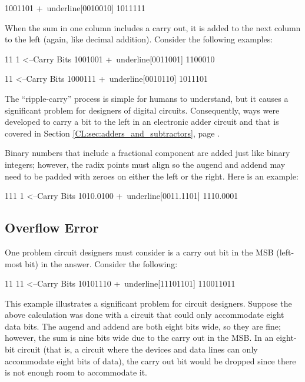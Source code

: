 \begin{binDisp}[commandchars=~\[\]]
      1001101
     +~underline[0010010]
      1011111
\end{binDisp}

When the sum in one column includes a carry out, it is added to the next column to the left (again, like decimal addition). Consider the following examples:

\begin{binDisp}[commandchars=~\[\]]
       11  1  <--Carry Bits
      1001001
     +~underline[0011001]
      1100010
\end{binDisp}

\begin{binDisp}[commandchars=~\[\], samepage=true]
         11   <--Carry Bits
      1000111
     +~underline[0010110]
      1011101
\end{binDisp}

The ``ripple-carry'' process is simple for humans to understand, but it causes a significant problem for designers of digital circuits. Consequently, ways were developed to carry a bit to the left in an electronic adder circuit and that is covered in Section \ref{CL:sec:adders_and_subtractors}, page \pageref{CL:sec:adders_and_subtractors}.

Binary numbers that include a fractional component are added just like binary integers; however, the radix points must align so the augend and addend may need to be padded with zeroes on either the left or the right. Here is an example: 

\begin{binDisp}[commandchars=~\[\]]
       111 1    <--Carry Bits
      1010.0100
     +~underline[0011.1101]
      1110.0001
\end{binDisp}

\subsection{Overflow Error}
\label{MO:sub:overflow_error}

One problem circuit designers must consider is a carry out bit in the \ac{MSB} (left-most bit) in the answer. Consider the following:

\begin{binDisp}[commandchars=~\[\]]
      11 11    <--Carry Bits
      10101110
     +~underline[11101101]
     110011011
\end{binDisp}

This example illustrates a significant problem for circuit designers. Suppose the above calculation was done with a circuit that could only accommodate eight data bits. The augend and addend are both eight bits wide, so they are fine; however, the sum is nine bits wide due to the carry out in the \ac{MSB}. In an eight-bit circuit (that is, a circuit where the devices and data lines can only accommodate eight bits of data), the carry out bit would be dropped since there is not enough room to accommodate it.

